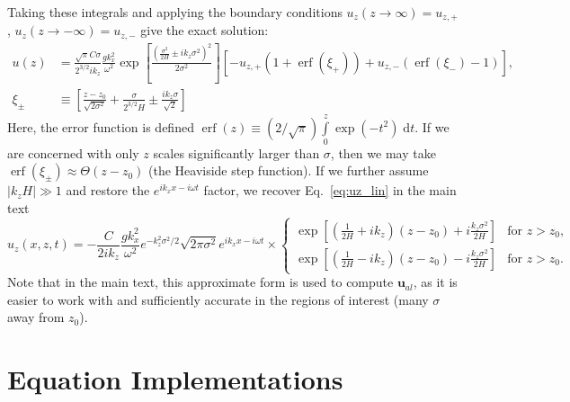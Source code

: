 \documentclass[
        fleqn,
        usenatbib,
        referee,
    ]{mnras}
\newcommand*{\abs}[1]{\left|#1\right|}
\newcommand*{\p}[1]{\left(#1\right)}
\newcommand*{\s}[1]{\left[#1\right]}
\newcommand*{\bm}[1]{\mathbf{#1}}
\DeclareMathOperator*{\erf}{erf}
\begin{document}
Taking these integrals and applying the boundary conditions $u_z\p{z \to \infty}
= u_{z,+}$, $u_z\p{z \to -\infty} = u_{z,-}$ give the exact solution:
\begin{align}
    u(z) &= \frac{\sqrt{\pi}C\sigma}{2^{3/2}ik_z}\frac{gk_x^2}{\omega^2}
            \exp\s{\frac{\p{\frac{\sigma^2}{2H} \pm ik_z\sigma^2}^2}{2\sigma^2}}
                \s{-u_{z,+}\p{1 + \erf\p{\xi_+}}
                    + u_{z,-} \p{\erf\p{\xi_-} - 1}},\\
    \xi_{\pm} &\equiv \s{\frac{z - z_0}{\sqrt{2\sigma^2}} +
        \frac{\sigma}{2^{3/2}H} \pm \frac{ik_z\sigma}{\sqrt{2}}}
\end{align}
Here, the error function is defined $\erf(z) \equiv
\p{2/\sqrt{\pi}}\int\limits_0^z \exp\p{-t^2}\;\mathrm{d}t$. If we are concerned
with only $z$ scales significantly larger than $\sigma$, then we may take
$\erf(\xi_{\pm}) \approx \Theta(z - z_0)$ (the Heaviside step function). If we
further assume $\abs{k_zH} \gg 1$ and restore the $e^{ik_xx - i\omega t}$
factor, we recover Eq.~\eqref{eq:uz_lin} in the main text
\begin{equation}
    u_{z}(x, z, t) = -\frac{C}{2ik_z}\frac{gk_x^2}{\omega^2}
        e^{-k_z^2\sigma^2 / 2}
        \sqrt{2\pi \sigma^2} e^{ik_xx - i\omega t} \times
    \begin{cases}
        \exp\s{\p{\frac{1}{2H} + ik_z}\p{z - z_0} + i\frac{k_z\sigma^2}{2H}}
            & \text{for }z > z_0,\\[5pt]
        \exp\s{\p{\frac{1}{2H} - ik_z}\p{z - z_0} - i\frac{k_z\sigma^2}{2H}}
            & \text{for }z > z_0.
    \end{cases}
\end{equation}
Note that in the main text, this approximate form is used to compute
$\bm{u}_{al}$, as it is easier to work with and sufficiently accurate in the
regions of interest (many $\sigma$ away from $z_0$).

\section{Equation Implementations}\label{se:strat_impl}
\end{document}
